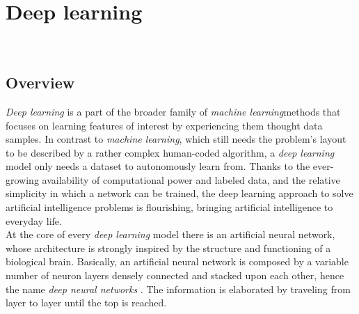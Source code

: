 
\chapter{Deep learning}
\label{cap:deep-learning}

\\

\section{Overview}
	\emph{Deep learning} is a part of the broader family of \emph{\gls{machine learning}}\glsfirstoccur methods that focuses on learning features of interest by experiencing them thought data samples. In contrast to \emph{machine learning}, which still needs the problem's layout to be described by a rather complex human-coded algorithm, a \emph{deep learning} model only needs a dataset to autonomously learn from. Thanks to the ever-growing availability of computational power and labeled data, and the relative simplicity in which a network can be trained, the deep learning approach to solve artificial intelligence problems is flourishing, bringing artificial intelligence to everyday life. \\
	At the core of every \emph{deep learning} model there is an artificial neural network, whose architecture is strongly inspired by the structure and functioning of a biological brain. Basically, an artificial neural network is composed by a variable number of neuron layers densely connected and stacked upon each other, hence the name \emph{deep neural networks} . The information is elaborated by traveling from layer to layer until the top is reached. \\

